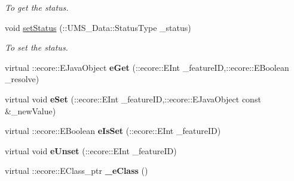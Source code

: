 \begin{DoxyCompactItemize}
\begin{DoxyCompactList}\small\item\em To get the status. \item\end{DoxyCompactList}\item 
void \hyperlink{classUMS__Data_1_1User_aa3325397921064a81f1aa227cd6f6d26}{setStatus} (::UMS\_\-Data::StatusType \_\-status)
\begin{DoxyCompactList}\small\item\em To set the status. \item\end{DoxyCompactList}\item 
\hypertarget{classUMS__Data_1_1User_a209716c0601167a9bb329cb083c2a87c}{
virtual ::ecore::EJavaObject {\bfseries eGet} (::ecore::EInt \_\-featureID,::ecore::EBoolean \_\-resolve)}
\label{classUMS__Data_1_1User_a209716c0601167a9bb329cb083c2a87c}

\item 
\hypertarget{classUMS__Data_1_1User_afec16943ff26a52c017231dbe2b49737}{
virtual void {\bfseries eSet} (::ecore::EInt \_\-featureID,::ecore::EJavaObject const \&\_\-newValue)}
\label{classUMS__Data_1_1User_afec16943ff26a52c017231dbe2b49737}

\item 
\hypertarget{classUMS__Data_1_1User_a9ee1be96a40cd7366e54d1945329c21a}{
virtual ::ecore::EBoolean {\bfseries eIsSet} (::ecore::EInt \_\-featureID)}
\label{classUMS__Data_1_1User_a9ee1be96a40cd7366e54d1945329c21a}

\item 
\hypertarget{classUMS__Data_1_1User_a117f0c01a38a8078878236b96cdeb037}{
virtual void {\bfseries eUnset} (::ecore::EInt \_\-featureID)}
\label{classUMS__Data_1_1User_a117f0c01a38a8078878236b96cdeb037}

\item 
\hypertarget{classUMS__Data_1_1User_a081567ee1aa838ecee4edf7ef11be554}{
virtual ::ecore::EClass\_\-ptr {\bfseries \_\-eClass} ()}
\label{classUMS__Data_1_1User_a081567ee1aa838ecee4edf7ef11be554}

\end{DoxyCompactItemize}
